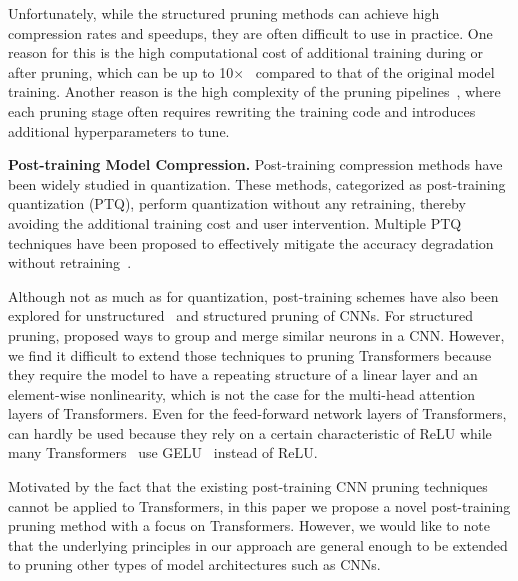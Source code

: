 Unfortunately, while the structured pruning methods can achieve high compression rates and speedups, they are often difficult to use in practice.
One reason for this is the high computational cost of additional training during or after pruning, which can be up to 10$\times$~\cite{lagunas2021block, xia2022structured} compared to that of the original model training.
Another reason is the high complexity of the pruning pipelines~\cite{hou2020dynabert, lagunas2021block, liu2021rosita, yao2021mlpruning}, where each pruning stage often requires rewriting the training code and introduces additional hyperparameters to tune.

\textbf{Post-training Model Compression.}
Post-training compression methods have been widely studied in quantization.
These methods, categorized as post-training quantization (PTQ), perform quantization without any retraining, thereby avoiding the additional training cost and user intervention.
Multiple PTQ techniques have been proposed to effectively mitigate the accuracy degradation without retraining~\cite{banner2018post, hubara2020improving, nagel2020up, zhao2019improving}.
 
Although not as much as for quantization, post-training schemes have also been explored for unstructured~\cite{frantar2022spdy, lazarevich2021post, mussay2019data} and structured pruning of CNNs.
For structured pruning, \cite{kim2020neuron, srinivas2015data, yvinec2021red} proposed ways to group and merge similar neurons in a CNN.
However, we find it difficult to extend those techniques to pruning Transformers because they require the model to have a repeating structure of a linear layer and an element-wise nonlinearity, which is not the case for the multi-head attention layers of Transformers.
Even for the feed-forward network layers of Transformers,
\cite{kim2020neuron, srinivas2015data} can hardly be used because they rely on a certain characteristic of ReLU while many Transformers~\cite{brown2020language, devlin2018bert, yang2019xlnet} use GELU~\cite{hendrycks2016gaussian} instead of ReLU.

Motivated by the fact that the existing post-training CNN pruning techniques cannot be applied to Transformers, in this paper we propose a novel post-training pruning method with a focus on Transformers.
However, we would like to note that the underlying principles in our approach are general enough to be extended to pruning other types of model architectures such as CNNs.
